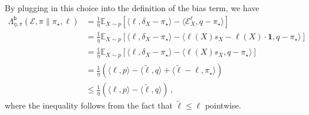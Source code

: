 \documentclass{article}
\theoremstyle{plain}
\theoremstyle{definition}
\theoremstyle{plain}
\newcommand{\E}{\mathbb E}
\newcommand{\cE}{\mathcal E}
\begin{document}
By plugging in this choice into the definition of the bias term, we have
\begin{align}
    \Lambda^{\mathsf{b}}_{\eta,\pi}(\cE,\hat{\pi}\| \pi_\star,\ell)
     & =
    \frac{1}{\eta}
    \E_{X\sim p}\left[
        \langle \ell,\delta_X -\pi_\star\rangle
        -
        \langle \cE_X^\ell,q-\pi_\star\rangle
    \right] \\
     & =
    \frac{1}{\eta}
    \E_{X\sim p}\left[
        \langle \ell,\delta_X -\pi_\star\rangle
        -
        \langle \ell(X) s_X - \ell(X)\cdot \mathbf{1},q-\pi_\star\rangle
    \right] \\
     & =
    \frac{1}{\eta}
    \E_{X\sim p}\left[
        \langle \ell,\delta_X -\pi_\star\rangle
        -
        \langle \ell(X) s_X ,q-\pi_\star\rangle
    \right] \\
     & =
    \frac{1}{\eta}
    \left(
    \langle \ell,p\rangle
    -
    \langle \tilde{\ell},q\rangle
    +
    \langle \tilde{\ell} - \ell, \pi_\star\rangle
    \right) \\
     & \leq
    \frac{1}{\eta}
    \left(
    \langle \ell,p\rangle
    -
    \langle \tilde{\ell},q\rangle
    \right)\,,
\end{align}
where the inequality follows from the fact that $\tilde{\ell} \leq \ell$ pointwise.
\end{document}
